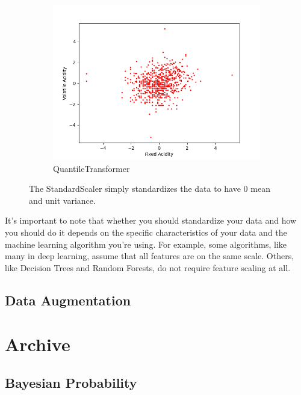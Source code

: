\documentclass{article}
\begin{document}
\begin{figure}[H]
\begin{subfigure}[b]{0.32\textwidth}
          \centering
              \includegraphics[width=\textwidth]{img/Quantile_Scaler.png}
              \caption{QuantileTransformer}
              \label{fig:quantile_transformer}
          \end{subfigure}
          
          \caption{The StandardScaler simply standardizes the data to have $0$ mean and unit variance.}
          \label{Scalers}
        \end{figure}

      It's important to note that whether you should standardize your data and how you should do it depends on the specific characteristics of your data and the machine learning algorithm you're using. For example, some algorithms, like many in deep learning, assume that all features are on the same scale. Others, like Decision Trees and Random Forests, do not require feature scaling at all. 

  \subsection{Data Augmentation}

\section{Archive}

  \subsection{Bayesian Probability}
\end{document}

